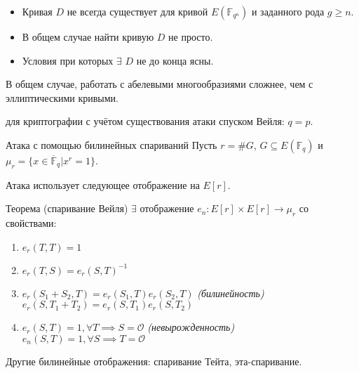 \documentclass{beamer}
\begin{document}
\begin{frame}
\begin{itemize}
    \item Кривая $D$ не всегда существует для кривой $E(\mathbb{F}_{q^n})$ и заданного рода $g \geq n$.
    \item В общем случае найти кривую $D$ не просто.
    \item Условия при которых $\exists$ $D$ не до конца ясны.
\end{itemize}

\vspace{0.5em}
В общем случае, работать с абелевыми многообразиями сложнее, чем с эллиптическими кривыми.

\vspace{0.5em}
 для криптографии с учётом существования атаки спуском Вейля: $q = p$.
\end{frame}

\begin{frame}{Атака с помощью билинейных спариваний}
Пусть $r = \#G$, $G \subseteq E(\mathbb{F}_q)$ и $\mu_r = \{x \in \overline{\mathbb{F}}_q | x^r = 1\}$.

Атака использует следующее отображение на $E[r]$.
    \begin{block}{Теорема (спаривание Вейля)}
    $\exists$ отображение
    $
    e_n: E[r] \times E[r] \rightarrow \mu_r
    $
    со свойствами:
    \begin{enumerate}
        \item $e_r(T,T) = 1$
        \item $e_r(T,S) = e_r(S,T)^{-1}$
        \item $e_r(S_1 + S_2, T) = e_r(S_1, T) e_r(S_2, T)$ \hfill \textit{(билинейность)} \\
        $e_r(S, T_1 + T_2) = e_r(S, T_1) e_r(S, T_2)$
        \item $e_r(S,T) = 1, \forall T \implies S = \mathcal{O}$ \hfill \textit{(невырожденность)}\\
        $e_n(S,T) = 1, \forall S \implies T = \mathcal{O}$
    \end{enumerate}
\end{block}

Другие билинейные отображения: спаривание Тейта, эта-спаривание.
\end{frame}
\end{document}
